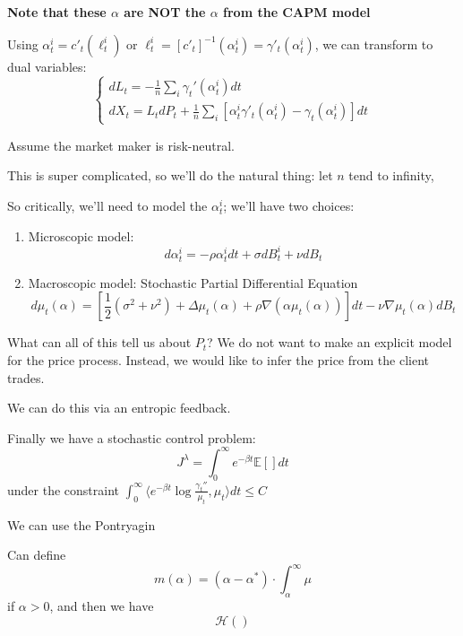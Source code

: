 {\bf Note that these $\alpha$ are NOT the $\alpha$ from the CAPM model}

Using $\alpha_t^i = c'_t(\ell_t^i)$ or $\ell_t^i = [c'_t]^{-1}(\alpha_t^i) = \gamma'_t(\alpha_t^i)$, we can 
transform to dual variables:
\begin{equation}
	\begin{cases}
		dL_t = -\frac{1}{n} \sum_i \gamma_t' (\alpha_t^i) dt\\
		dX_t = L_t dP_t + \frac{1}{n} \sum_i \left[ \alpha_t^i \gamma'_t(\alpha^i_t) - \gamma_t(\alpha_t^i) \right]dt
	\end{cases}
\end{equation}

Assume the market maker is risk-neutral.

This is super complicated, so we'll do the natural thing: let $n$ tend to infinity, 

So critically, we'll need to model the $\alpha_t^i$; we'll have two choices:
\begin{enumerate}
	\item Microscopic model:
	\begin{equation}
		d \alpha_t^i = -\rho \alpha_t^i dt + \sigma dB_t^i + \nu dB_t
	\end{equation}
	
	\item Macroscopic model: Stochastic Partial Differential Equation
	\begin{equation}
		d\mu_t(\alpha) = \left[ \frac{1}{2}(\sigma^2 + \nu^2) + \Delta \mu_t(\alpha) + \rho \nabla (\alpha \mu_t(\alpha)) \right]dt - \nu \nabla \mu_t(\alpha)dB_t
	\end{equation}
\end{enumerate}

What can all of this tell us about $P_t$? We do not want to make an explicit model for the price process. Instead, we would like to infer the price from the client trades.

We can do this via an entropic feedback.

Finally we have a stochastic control problem:
\begin{equation}
	J^\lambda = \int_0^\infty e^{-\beta t} \mathbb{E} \left[ \right] dt
\end{equation}
under the constraint $\int_0^\infty \langle e^{-\beta t}\log \frac{\gamma_t''}{\mu_t}, \mu_t \rangle dt \leq C$

We can use the Pontryagin


Can define
\begin{equation}
	m(\alpha ) = (\alpha - \alpha^*) \cdot \int_\alpha^\infty \mu
\end{equation}
if $\alpha>0$, and then we have
\begin{equation}
	\mathcal{H}()
\end{equation}

